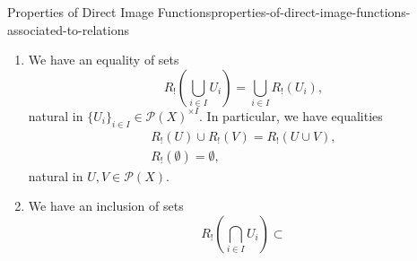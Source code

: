 \begin{proposition}{Properties of Direct Image Functions}{properties-of-direct-image-functions-associated-to-relations}
\begin{enumerate}
\begin{enumerate}
\begin{gather*}
                        U\subset R_{-1}(R_{!}(U)),\\
                        R_{!}(R_{-1}(V))\subset V
                    \end{gather*}
                    indexed by $U\in\mathcal{P}(X)$ and $V\in\mathcal{P}(Y)$
                \item\label{properties-of-direct-image-functions-associated-to-relations-adjointness-2}A bijections of sets
                    \[%
                        \Hom_{\mathcal{P}(X)}(R_{!}(U),V)%
                        \cong%
                        \Hom_{\mathcal{P}(X)}(U,R_{-1}(V)),%
                    \]%
                    natural in $U\in\mathcal{P}(X)$ and $V\in\mathcal{P}(Y)$. In particular:
                    \begin{itemize}
                        \itemstar The following conditions are equivalent:
                            \begin{itemize}
                                \item We have $R_{!}(U)\subset V$.
                                \item We have $U\subset R_{-1}(V)$.
                            \end{itemize}
                    \end{itemize}
            \end{enumerate}
        \item\label{properties-of-direct-image-functions-associated-to-relations-preservation-of-colimits}We have an equality of sets
            \[
                R_{!}(\bigcup_{i\in I}U_{i})%
                =%
                \bigcup_{i\in I}R_{!}(U_{i}),%
            \]%
            natural in $\{U_{i}\}_{i\in I}\in\mathcal{P}(X)^{\times I}$. In particular, we have equalities%
            \[
                \begin{gathered}
                    R_{!}(U)\cup R_{!}(V)                  = R_{!}(U\cup V),\\
                    R_{!}(\emptyset)                       = \emptyset,
                \end{gathered}
            \]%
            natural in $U,V\in\mathcal{P}(X)$.
        \item\label{properties-of-direct-image-functions-associated-to-relations-oplax-preservation-of-limits}We have an inclusion of sets
            \[
                R_{!}(\bigcap_{i\in I}U_{i})%
                \subset%
\]
\end{enumerate}
\end{proposition}
